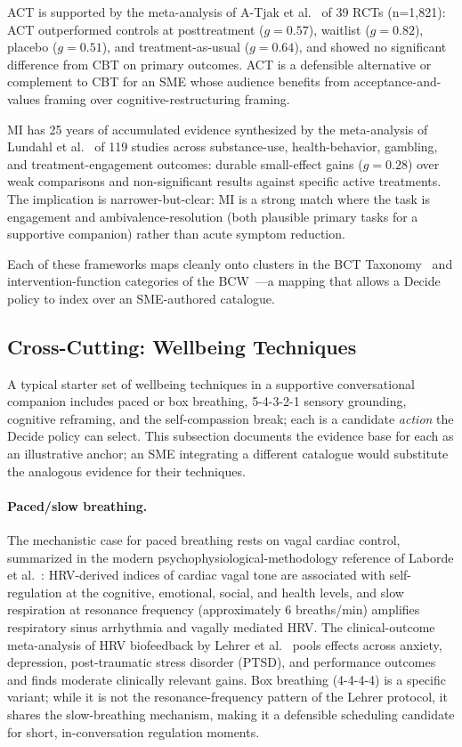 \documentclass[11pt,a4paper]{article}
\begin{document}
ACT is supported by the meta-analysis of A-Tjak et
al.~\cite{ATjak2015ACTMeta} of 39 RCTs (n=1{,}821): ACT outperformed
controls at posttreatment ($g\!=\!0.57$), waitlist
($g\!=\!0.82$), placebo ($g\!=\!0.51$), and treatment-as-usual
($g\!=\!0.64$), and showed no significant difference from CBT on
primary outcomes. ACT is a defensible alternative or complement to
CBT for an SME whose audience benefits from acceptance-and-values
framing over cognitive-restructuring framing.

MI has 25 years of accumulated evidence synthesized by the
meta-analysis of Lundahl et al.~\cite{Lundahl2010MIMeta} of 119
studies across substance-use, health-behavior, gambling, and
treatment-engagement outcomes: durable small-effect gains
($g\!=\!0.28$) over weak comparisons and non-significant results
against specific active treatments. The implication is
narrower-but-clear: MI is a strong match where the task is
engagement and ambivalence-resolution (both plausible primary
tasks for a supportive companion) rather than acute symptom
reduction.

Each of these frameworks maps cleanly onto clusters in the BCT
Taxonomy~\cite{Michie2013BCTTaxonomy} and intervention-function
categories of the BCW~\cite{Michie2011BCW}---a mapping that allows
a Decide policy to index over an SME-authored catalogue.

\subsection{Cross-Cutting: Wellbeing Techniques}\label{sec:techniques}

A typical starter set of wellbeing techniques in a supportive
conversational companion includes paced or box breathing,
5-4-3-2-1 sensory grounding, cognitive reframing, and the
self-compassion break; each is a candidate \emph{action} the
Decide policy can select. This subsection documents the evidence
base for each as an illustrative anchor; an SME integrating a
different catalogue would substitute the analogous evidence for
their techniques.

\paragraph{Paced/slow breathing.} The mechanistic case for paced
breathing rests on vagal cardiac control, summarized in the modern
psychophysiological-methodology reference of Laborde et
al.~\cite{Laborde2017HRV}: HRV-derived indices of cardiac vagal
tone are associated with self-regulation at the cognitive,
emotional, social, and health levels, and slow respiration at
resonance frequency (approximately 6 breaths/min) amplifies
respiratory sinus arrhythmia and vagally mediated HRV. The
clinical-outcome meta-analysis of HRV biofeedback by Lehrer et
al.~\cite{Lehrer2020HRVBiofeedback} pools effects across anxiety,
depression, post-traumatic stress disorder (PTSD), and performance
outcomes and finds moderate clinically relevant gains. Box
breathing (4-4-4-4) is a specific variant; while it is not the
resonance-frequency pattern of the Lehrer protocol, it shares the
slow-breathing mechanism, making it a defensible scheduling
candidate for short, in-conversation regulation moments.
\end{document}
